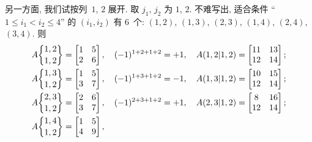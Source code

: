 \documentclass[../libro.tex]{subfiles}
\begin{document}
\begin{example}
    另一方面,
    我们试按列~\(1\), \(2\) 展开.
    取 \(j_1\), \(j_2\) 为 \(1\), \(2\).
    不难写出, 适合条件
    ``\(1 \leq i_1 < i_2 \leq 4\)''
    的 \((i_1, i_2)\) 有 \(6\)~个:
    \((1, 2)\),
    \((1, 3)\), \((2, 3)\),
    \((1, 4)\), \((2, 4)\), \((3, 4)\).
    则
    \begin{align*}
        & A\submat{1,2}{1,2} =
        \begin{bmatrix}
            1 & 5 \\
            2 & 6 \\
        \end{bmatrix},
        \quad
        (-1)^{1+2+1+2} = +1,
        \quad
        A(1,2|1,2) =
        \begin{bmatrix}
            11 & 13 \\
            12 & 14 \\
        \end{bmatrix};
        \\
        & A\submat{1,3}{1,2} =
        \begin{bmatrix}
            1 & 5 \\
            3 & 7 \\
        \end{bmatrix},
        \quad
        (-1)^{1+3+1+2} = -1,
        \quad
        A(1,3|1,2) =
        \begin{bmatrix}
            10 & 15 \\
            12 & 14 \\
        \end{bmatrix};
        \\
        & A\submat{2,3}{1,2} =
        \begin{bmatrix}
            2 & 6 \\
            3 & 7 \\
        \end{bmatrix},
        \quad
        (-1)^{2+3+1+2} = +1,
        \quad
        A(2,3|1,2) =
        \begin{bmatrix}
            8 & 16 \\
            12 & 14 \\
        \end{bmatrix};
        \\
        & A\submat{1,4}{1,2} =
        \begin{bmatrix}
            1 & 5 \\
            4 & 9 \\
        \end{bmatrix},
        \quad

\end{align*}
\end{example}
\end{document}
